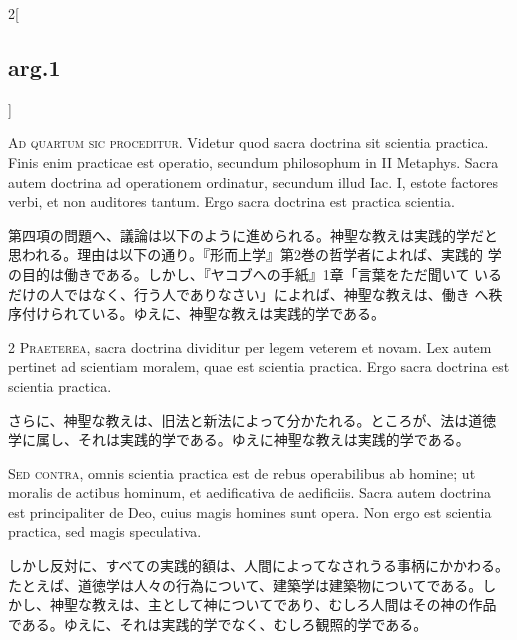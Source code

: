 \documentclass[
paper=a4paper,
fontsize=10pt,
jafontsize=9pt,
titlepage
]{jlreq}
\begin{document}
\begin{paracol}{2}[\subsection{arg.1}]

{\Huge A}{\scshape d quartum sic proceditur}. Videtur quod sacra
doctrina sit scientia practica. Finis enim practicae est operatio,
secundum philosophum in II Metaphys. Sacra autem doctrina ad
operationem ordinatur, secundum illud Iac. I, estote factores verbi,
et non auditores tantum. Ergo sacra doctrina est practica scientia.

\switchcolumn

第四項の問題へ、議論は以下のように進められる。神聖な教えは実践的学だと
思われる。理由は以下の通り。『形而上学』第2巻の哲学者によれば、実践的
学の目的は働きである。しかし、『ヤコブへの手紙』1章「言葉をただ聞いて
いるだけの人ではなく、行う人でありなさい」によれば、神聖な教えは、働き
へ秩序付けられている。ゆえに、神聖な教えは実践的学である。


{\scshape 2 Praeterea}, sacra doctrina dividitur per legem veterem et
novam. Lex autem pertinet ad scientiam moralem, quae est scientia
practica. Ergo sacra doctrina est scientia practica.

\switchcolumn

さらに、神聖な教えは、旧法と新法によって分かたれる。ところが、法は道徳
学に属し、それは実践的学である。ゆえに神聖な教えは実践的学である。

\switchcolumn*[\subsection{s.c.}]

{\scshape Sed contra}, omnis scientia practica est de
rebus operabilibus ab homine; ut moralis de actibus hominum, et
aedificativa de aedificiis. Sacra autem doctrina est principaliter de
Deo, cuius magis homines sunt opera. Non ergo est scientia practica, sed
magis speculativa.

\switchcolumn

しかし反対に、すべての実践的額は、人間によってなされうる事柄にかかわる。
たとえば、道徳学は人々の行為について、建築学は建築物についてである。し
かし、神聖な教えは、主として神についてであり、むしろ人間はその神の作品
である。ゆえに、それは実践的学でなく、むしろ観照的学である。


\end{paracol}
\end{document}
